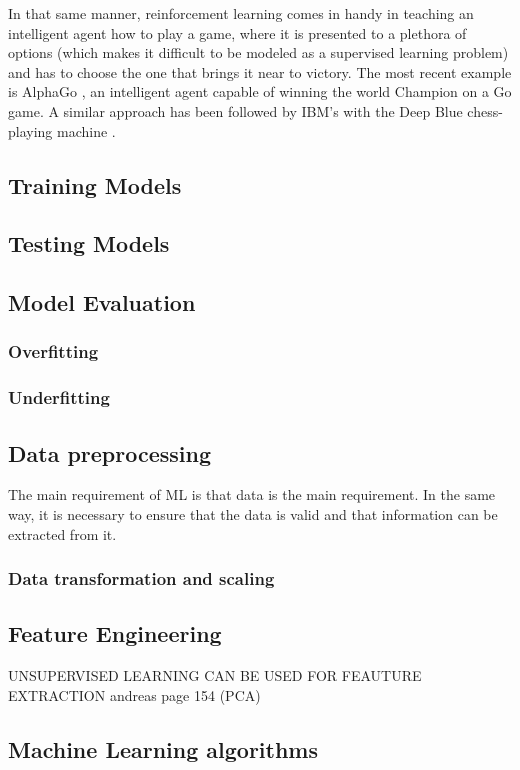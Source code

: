 In that same manner, reinforcement learning comes in handy in teaching an intelligent agent how to play a game, where it is presented to a plethora of options (which makes it difficult to be modeled as a supervised learning problem) and has to choose the one that brings it near to victory. The most recent example is AlphaGo \cite{Fu2017}, an intelligent agent capable of winning the world Champion on a Go game. A similar approach has been followed by IBM's with the Deep Blue chess-playing machine \cite{Hsu1999}.

\subsection{Training Models}

\subsection{Testing Models}
\subsection{Model Evaluation}
\subsubsection{Overfitting}
\subsubsection{Underfitting}
\subsection{Data preprocessing}
The main requirement of \ac{ML} is that data is the main requirement. In the same way, it is necessary to ensure that the data is valid and that information can be extracted from it.
\subsubsection{Data transformation and scaling}
\subsection{Feature Engineering}

UNSUPERVISED LEARNING CAN BE USED FOR FEAUTURE EXTRACTION andreas page 154 (PCA)

\subsection{Machine Learning algorithms}\label{ch:ml_algs}
